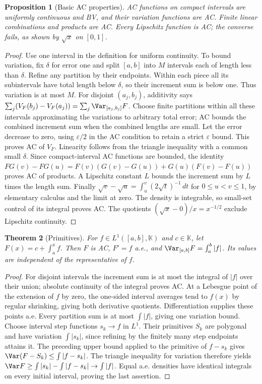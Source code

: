 \documentclass[11pt,oneside,openany]{book}
\newtheorem{theorem}{Theorem}[chapter]
\newtheorem{proposition}[theorem]{Proposition}
\theoremstyle{definition}
\theoremstyle{remark}
\newcommand{\eps}{\varepsilon}\newcommand{\ee}{\varepsilon}
\newcommand{\family}[1]{}
\begin{document}
\begin{proposition}[Basic AC properties]\family{D11.12.ac_basic}\label{d11:12:ac-basic}
AC functions on compact intervals are uniformly continuous and BV, and
their variation functions are AC. Finite linear combinations and products
are AC. Every Lipschitz function is AC; the converse fails, as shown by
$\sqrt x$ on $[0,1]$.
\end{proposition}
\begin{proof}
Use one interval in the definition for uniform continuity. To bound
variation, fix $\delta$ for error one and split $[a,b]$ into $M$ intervals
each of length less than $\delta$. Refine any partition by their endpoints.
Within each piece all its subintervals have total length below $\delta$,
so their increment sum is below one. Thus variation is at most $M$.
For disjoint $(a_j,b_j)$, additivity says
$\sum_j(V_F(b_j)-V_F(a_j))=\sum_j\Var_{[a_j,b_j]}F$.
Choose finite partitions within all these intervals approximating the
variations to arbitrary total error; AC bounds the combined increment
sum when the combined lengths are small. Let the error decrease to zero,
using $\eps/2$ in the AC condition to retain a strict $\eps$ bound.
This proves AC of $V_F$.
Linearity follows from the triangle inequality with a common small
$\delta$. Since compact-interval AC functions are bounded, the identity
$FG(v)-FG(u)=F(v)(G(v)-G(u))+G(u)(F(v)-F(u))$ proves AC of products.
A Lipschitz constant $L$ bounds the increment sum by $L$ times the length
sum. Finally $\sqrt v-\sqrt u=\int_u^v(2\sqrt t)^{-1}\,dt$ for
$0\leq u<v\leq1$, by elementary calculus and the limit at zero.
The density is integrable, so small-set control of its integral proves AC.
The quotients $(\sqrt x-0)/x=x^{-1/2}$ exclude Lipschitz continuity.
\end{proof}

\begin{theorem}[Primitives]\family{D11.12.ac_primitive}\label{d11:12:ac-primitive}
For $f\in L^1([a,b],\mathbb K)$ and $c\in\mathbb K$, let
$F(x)=c+\int_a^xf$. Then $F$ is AC, $F'=f$ a.e., and
$\Var_{[a,b]}F=\int_a^b|f|$. Its values are independent of the
representative of $f$.
\end{theorem}
\begin{proof}
For disjoint intervals the increment sum is at most the integral of
$|f|$ over their union; absolute continuity of the integral proves AC.
At a Lebesgue point of the extension of $f$ by zero, the one-sided interval
averages tend to $f(x)$ by regular shrinking, giving both derivative
quotients. Differentiation supplies these points a.e.
Every partition sum is at most $\int|f|$, giving one variation bound.
Choose interval step functions $s_k\to f$ in $L^1$. Their primitives
$S_k$ are polygonal and have variation $\int|s_k|$, since refining by
the finitely many step endpoints attains it. The preceding upper bound
applied to the primitive of $f-s_k$ gives
$\Var(F-S_k)\leq\int|f-s_k|$. The triangle inequality for variation
therefore yields
$\Var F\geq\int|s_k|-\int|f-s_k|\to\int|f|$.
Equal a.e. densities have identical integrals on every initial interval,
proving the last assertion.
\end{proof}
\end{document}

